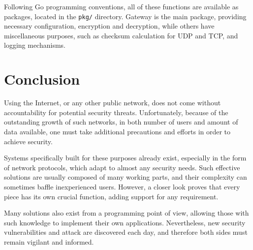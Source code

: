 \documentclass[a4paper,12pt]{report}
\begin{document}
		Following Go programming conventions, all of these functions are available as packages, located in the \texttt{pkg/} directory. Gateway is the main package, providing necessary configuration, encryption and decryption, while others have miscellaneous purposes, such as checksum calculation for UDP and TCP, and logging mechanisms.
		
		\chapter{Conclusion}
		Using the Internet, or any other public network, does not come without accountability for potential security threats. Unfortunately, because of the outstanding growth of such networks, in both number of users and amount of data available, one must take additional precautions and efforts in order to achieve security.
		
		Systems specifically built for these purposes already exist, especially in the form of network protocols, which adapt to almost any security needs. Such effective solutions are usually composed of many working parts, and their complexity can sometimes baffle inexperienced users. However, a closer look proves that every piece has its own crucial function, adding support for any requirement.
		
		Many solutions also exist from a programming point of view, allowing those with such knowledge to implement their own applications. Nevertheless, new security vulnerabilities and attack are discovered each day, and therefore both sides must remain vigilant and informed. 


\end{document}
